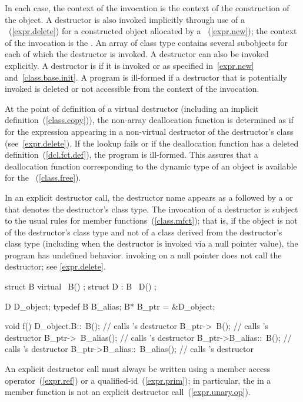 %
%
In each case, the context of the invocation is the context of the construction of
the object. A destructor is also invoked implicitly through use of a
~(\ref{expr.delete}) for a constructed object allocated
by a ~(\ref{expr.new}); the context of the invocation is the
.
\enternote An array of class type contains several subobjects for each of which
the destructor is invoked. \exitnote
A destructor can also be invoked explicitly. A destructor is 
if it is invoked or as specified in~\ref{expr.new} and~\ref{class.base.init}.
A program is ill-formed if a destructor that is potentially invoked is deleted
or not accessible from the context of the invocation.

\pnum
At the point of definition of a virtual destructor (including an implicit
definition~(\ref{class.copy})), the non-array deallocation function is 
determined as if for the expression  appearing in a
non-virtual destructor of the destructor's class (see~\ref{expr.delete}).
If the lookup fails or if the deallocation function has
a deleted definition~(\ref{dcl.fct.def}), the program is ill-formed.
\enternote
This assures that a deallocation function corresponding to the dynamic type of an
object is available for the
~(\ref{class.free}).
\exitnote

\pnum
{}%
In an explicit destructor call, the destructor name appears as a
\tcode{\~{}}
followed by a
 or 
that denotes the destructor's class type.
The invocation of a destructor is subject to the usual rules for member
functions~(\ref{class.mfct});
that is, if the object is not of the destructor's class type and
not of a class derived from the destructor's class type (including when
the destructor is invoked via a null pointer value), the program has
undefined behavior.
\enternote invoking  on a null pointer does not call the
destructor; see \ref{expr.delete}. \exitnote
\enterexample

\begin{codeblock}
struct B {
  virtual ~B() { }
};
struct D : B {
  ~D() { }
};

D D_object;
typedef B B_alias;
B* B_ptr = &D_object;

void f() {
  D_object.B::~B();             // calls 's destructor
  B_ptr->~B();                  // calls 's destructor
  B_ptr->~B_alias();            // calls 's destructor
  B_ptr->B_alias::~B();         // calls 's destructor
  B_ptr->B_alias::~B_alias();   // calls 's destructor
}
\end{codeblock}
\exitexample
\enternote
An explicit destructor call must always be written using
a member access operator~(\ref{expr.ref}) or a qualified-id~(\ref{expr.prim});
in particular, the
in a member function is not an explicit destructor call~(\ref{expr.unary.op}).
\exitnote

